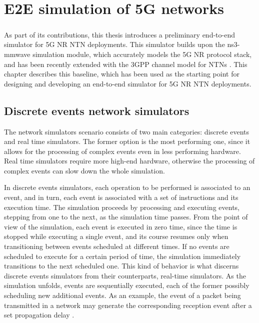 
\chapter{E2E simulation of 5G networks}
\label{chp:ns3}

\paragraph{}
As part of its contributions, this thesis introduces a preliminary end-to-end simulator for 5G \ac{NR} \ac{NTN} deployments. This simulator builds upon the ns3-mmwave simulation module, which accurately models the 5G \ac{NR} protocol stack, and has been recently extended with the 3GPP channel model for NTNs \cite{Sandri_2023}. This chapter describes this baseline, which has been used as the starting point for designing and developing an end-to-end simulator for 5G \ac{NR} \ac{NTN} deployments.

\section{Discrete events network simulators}
The network simulators scenario consists of two main categories: discrete events and real time simulators. The former option is the most performing one, since it allows for the processing of complex events even in less performing hardware. Real time simulators require more high-end hardware, otherwise the processing of complex events can slow down the whole simulation.

In discrete events simulators, each operation to be performed is associated to an event, and in turn, each event is associated with a set of instructions and its execution time. The simulation proceeds by processing and executing events, stepping from one to the next, as the simulation time passes. From the point of view of the simulation, each event is executed in zero time, since the time is stopped while executing a single event, and its course resumes only when transitioning between events scheduled at different times. If no events are scheduled to execute for a certain period of time, the simulation immediately transitions to the next scheduled one. This kind of behavior is what discerns discrete events simulators from their counterparts,  real-time simulators. As the simulation unfolds, events are sequentially executed, each of the former possibly scheduling new additional events. As an example, the event of a packet being transmitted in a network may generate the corresponding reception event after a set propagation delay \cite{review-ns3}.

